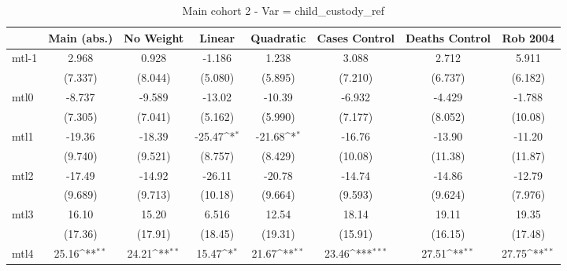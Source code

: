 \documentclass{article}
\begin{document}
{
\def\sym#1{\ifmmode^{#1}\else\(^{#1}\)\fi}
\begin{longtable}{l*{7}{c}}
\caption{Main cohort 2 - Var = child\_custody\_ref}\\
\hline\hline\endfirsthead\hline\endhead\hline\endfoot\endlastfoot
                &\multicolumn{1}{c}{Main (abs.)}&\multicolumn{1}{c}{No Weight}&\multicolumn{1}{c}{Linear}&\multicolumn{1}{c}{Quadratic}&\multicolumn{1}{c}{Cases Control}&\multicolumn{1}{c}{Deaths Control}&\multicolumn{1}{c}{Rob 2004}\\
\hline
mtl-1           &    2.968         &    0.928         &   -1.186         &    1.238         &    3.088         &    2.712         &    5.911         \\
                &  (7.337)         &  (8.044)         &  (5.080)         &  (5.895)         &  (7.210)         &  (6.737)         &  (6.182)         \\
mtl0            &   -8.737         &   -9.589         &   -13.02         &   -10.39         &   -6.932         &   -4.429         &   -1.788         \\
                &  (7.305)         &  (7.041)         &  (5.162)         &  (5.990)         &  (7.177)         &  (8.052)         &  (10.08)         \\
mtl1            &   -19.36         &   -18.39         &   -25.47\sym{*}  &   -21.68\sym{*}  &   -16.76         &   -13.90         &   -11.20         \\
                &  (9.740)         &  (9.521)         &  (8.757)         &  (8.429)         &  (10.08)         &  (11.38)         &  (11.87)         \\
mtl2            &   -17.49         &   -14.92         &   -26.11         &   -20.78         &   -14.74         &   -14.86         &   -12.79         \\
                &  (9.689)         &  (9.713)         &  (10.18)         &  (9.664)         &  (9.593)         &  (9.624)         &  (7.976)         \\
mtl3            &    16.10         &    15.20         &    6.516         &    12.54         &    18.14         &    19.11         &    19.35         \\
                &  (17.36)         &  (17.91)         &  (18.45)         &  (19.31)         &  (15.91)         &  (16.15)         &  (17.48)         \\
mtl4            &    25.16\sym{**} &    24.21\sym{**} &    15.47\sym{*}  &    21.67\sym{**} &    23.46\sym{***}&    27.51\sym{**} &    27.75\sym{**} \\

\end{longtable}}
\end{document}
